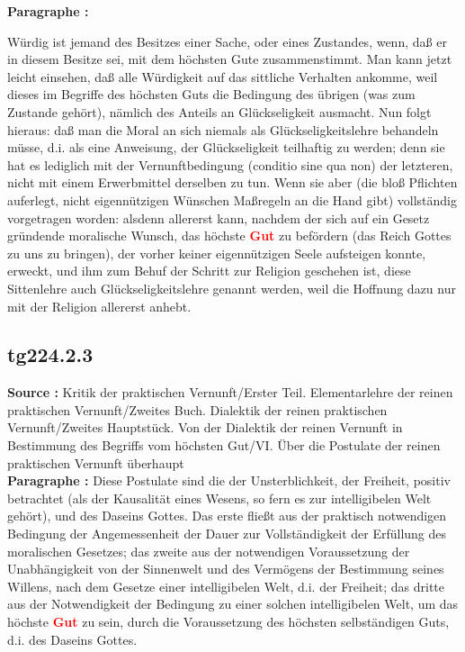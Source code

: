 \documentclass[a4paper,12pt,twoside]{book}
\newcommand{\match}[1]{\textcolor{red}{\textbf{#1}}}
\begin{document}
	\textbf{Paragraphe : }
	
	Würdig ist jemand des Besitzes einer Sache, oder eines Zustandes, wenn, daß er in diesem Besitze sei, mit dem höchsten Gute zusammenstimmt. Man kann jetzt leicht einsehen, daß alle Würdigkeit auf das sittliche Verhalten ankomme, weil dieses im Begriffe des höchsten Guts die Bedingung des übrigen (was zum Zustande gehört), nämlich des Anteils an Glückseligkeit ausmacht. Nun folgt hieraus: daß man die Moral an sich niemals als Glückseligkeitslehre behandeln müsse, d.i. als eine Anweisung, der Glückseligkeit teilhaftig zu werden; denn sie hat es lediglich mit der Vernunftbedingung (conditio sine qua non) der letzteren, nicht mit einem Erwerbmittel derselben zu tun. Wenn sie aber (die bloß Pflichten auferlegt, nicht eigennützigen Wünschen Maßregeln an die Hand gibt) vollständig vorgetragen worden: alsdenn allererst kann, nachdem der sich auf ein Gesetz gründende moralische Wunsch, das höchste \match{Gut} zu befördern (das Reich Gottes zu uns zu bringen), der vorher keiner eigennützigen Seele aufsteigen konnte, erweckt, und ihm zum Behuf der Schritt zur Religion geschehen ist, diese Sittenlehre auch Glückseligkeitslehre genannt werden, weil die Hoffnung dazu nur mit der Religion allererst anhebt. 
	
	\subsection*{tg224.2.3} 
	\textbf{Source : }Kritik der praktischen Vernunft/Erster Teil. Elementarlehre der reinen praktischen Vernunft/Zweites Buch. Dialektik der reinen praktischen Vernunft/Zweites Hauptstück. Von der Dialektik der reinen Vernunft in Bestimmung des Begriffs vom höchsten Gut/VI. Über die Postulate der reinen praktischen Vernunft überhaupt\\  
	
	\textbf{Paragraphe : }Diese Postulate sind die der Unsterblichkeit, der Freiheit, positiv betrachtet (als der Kausalität eines Wesens, so fern es zur intelligibelen Welt gehört), und des Daseins Gottes. Das erste fließt aus der praktisch notwendigen Bedingung der Angemessenheit der Dauer zur Vollständigkeit der Erfüllung des moralischen Gesetzes; das zweite aus der notwendigen Voraussetzung der Unabhängigkeit von der Sinnenwelt und des Vermögens der Bestimmung seines Willens, nach dem Gesetze einer intelligibelen Welt, d.i. der Freiheit; das dritte aus der Notwendigkeit der Bedingung zu einer solchen intelligibelen Welt, um das höchste \match{Gut} zu sein, durch die Voraussetzung des höchsten selbständigen Guts, d.i. des Daseins Gottes. 
	
\end{document}
